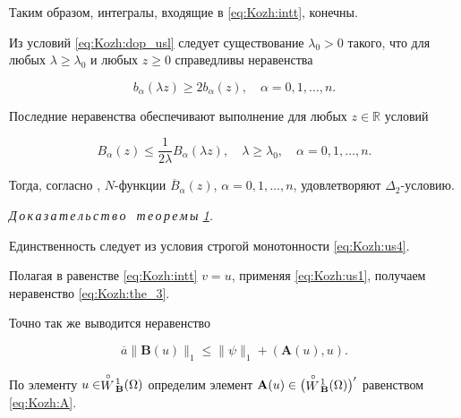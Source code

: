 Таким образом, интегралы, входящие в \eqref{eq:Kozh:intt},  конечны.



\smallskip



\begin{remark}[4]

Из условий \eqref{eq:Kozh:dop_usl} следует существование $\lambda_0>0$ такого, что для любых $\lambda\geq\lambda_0$ и любых $z\geq 0$ справедливы неравенства

$$b_{\alpha}(\lambda z)\geq 2 b_{\alpha}(z),\quad \alpha=0, 1,\ldots,n.$$

Последние неравенства обеспечивают выполнение для любых $z\in\mathbb{R}$ условий

$$B_{\alpha}(z)\leq \frac{1}{2\lambda}B_{\alpha}(\lambda z),\quad \lambda\geq\lambda_0,\quad \alpha=0, 1,\ldots,n.

$$

 Тогда, согласно  \cite[I, \S~4, теорема 4.2]{KozhKhad:bib:Rut}, $N$-функции $\overline{B}_{\alpha}(z)$, $\alpha=0, 1,\ldots,n$, удовлетворяют $\Delta_2$-условию.

\end{remark}



\smallskip



{\it Д\,о\,к\,а\,з\,а\,т\,е\,л\,ь\,с\,т\,в\,о \ т\,е\,о\,р\,е\,м\,ы \rm \hyperlink{kozh:th1}{1}.}

Единственность следует из условия строгой монотонности \eqref{eq:Kozh:us4}.

Полагая  в  равенстве \eqref{eq:Kozh:intt} $v=u$,  применяя \eqref{eq:Kozh:us1}, получаем неравенство \eqref{eq:Kozh:the_3}.

 Точно так же выводится неравенство

\begin{equation}\label{eq:Kozh:the_3(4)}

\overline{a}\|\mathbf{B}(u)\|_{1}\leq \|\psi\|_{1}+(\mathbf{A}(u),u).

\end{equation}





По элементу $u\in\stackrel {\circ}

{W}\!_{\bf B}^{1}(\Omega)$ определим элемент $\mathbf{A}(u)\in\bigl(\stackrel {\circ}

{W}\!_{\bf B}^{1}(\Omega)\bigr)'$ равенством \eqref{eq:Kozh:A}.

